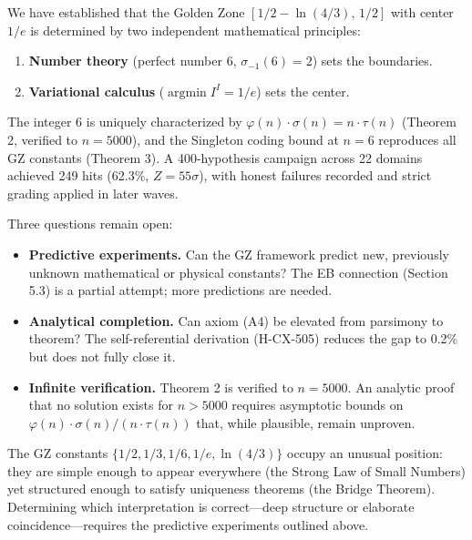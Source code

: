 \documentclass[11pt,a4paper]{article}
\begin{document}
We have established that the Golden Zone $[1/2 - \ln(4/3),\, 1/2]$ with center $1/e$ is determined by two independent mathematical principles:

\begin{enumerate}
  \item \textbf{Number theory} (perfect number 6, $\sigma_{-1}(6) = 2$) sets the boundaries.
  \item \textbf{Variational calculus} ($\operatorname{argmin} I^I = 1/e$) sets the center.
\end{enumerate}

The integer 6 is uniquely characterized by $\varphi(n) \cdot \sigma(n) = n \cdot \tau(n)$ (Theorem 2, verified to $n = 5000$), and the Singleton coding bound at $n = 6$ reproduces all GZ constants (Theorem 3). A 400-hypothesis campaign across 22 domains achieved 249 hits (62.3\%, $Z = 55\sigma$), with honest failures recorded and strict grading applied in later waves.

Three questions remain open:

\begin{itemize}
  \item \textbf{Predictive experiments.} Can the GZ framework predict new, previously unknown mathematical or physical constants? The EB connection (Section 5.3) is a partial attempt; more predictions are needed.
  \item \textbf{Analytical completion.} Can axiom (A4) be elevated from parsimony to theorem? The self-referential derivation (H-CX-505) reduces the gap to 0.2\% but does not fully close it.
  \item \textbf{Infinite verification.} Theorem 2 is verified to $n = 5000$. An analytic proof that no solution exists for $n > 5000$ requires asymptotic bounds on $\varphi(n) \cdot \sigma(n) / (n \cdot \tau(n))$ that, while plausible, remain unproven.
\end{itemize}

The GZ constants $\{1/2, 1/3, 1/6, 1/e, \ln(4/3)\}$ occupy an unusual position: they are simple enough to appear everywhere (the Strong Law of Small Numbers) yet structured enough to satisfy uniqueness theorems (the Bridge Theorem). Determining which interpretation is correct---deep structure or elaborate coincidence---requires the predictive experiments outlined above.
\end{document}
